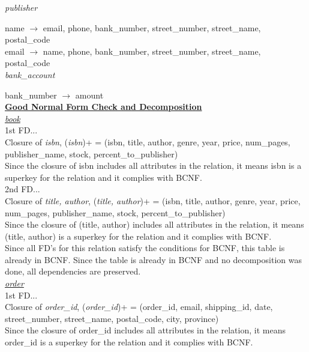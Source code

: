 \documentclass[a4 paper]{article}
\begin{document}
\noindent\emph{publisher}

name $\rightarrow$ email, phone, bank\_number, street\_number, street\_name, postal\_code\\
\indent email $\rightarrow$ name, phone, bank\_number, street\_number, street\_name, postal\_code\\

\noindent\emph{bank\_account}

bank\_number $\rightarrow$ amount\\

\noindent\underline{\textbf{Good Normal Form Check and Decomposition}}\\

\noindent\underline{\emph{book}}\\

\noindent 1st FD...\\
\indent Closure of \emph{isbn}, (\emph{isbn})+ = (isbn, title, author, genre, year, price, num\_pages, publisher\_name, stock, percent\_to\_publisher)\\
\indent Since the closure of isbn includes all attributes in the relation, it means isbn is a superkey for the relation and it complies with BCNF.\\

\noindent 2nd FD...\\
\indent Closure of \emph{title, author}, (\emph{title, author})+ = (isbn, title, author, genre, year, price, num\_pages, publisher\_name, stock, percent\_to\_publisher)\\
\indent Since the closure of (title, author) includes all attributes in the relation, it means (title, author) is a superkey for the relation and it complies with BCNF.\\

\noindent Since all FD's for this relation satisfy the conditions for BCNF, this table is already in BCNF. Since the table is already in BCNF and no decomposition was done, all dependencies are preserved.\\

\noindent\underline{\emph{order}}\\

\noindent 1st FD...\\
\indent Closure of \emph{order\_id}, (\emph{order\_id})+ = (order\_id, email, shipping\_id, date, street\_number, street\_name, postal\_code, city, province)\\
\indent Since the closure of order\_id includes all attributes in the relation, it means order\_id is a superkey for the relation and it complies with BCNF.\\
\end{document}
